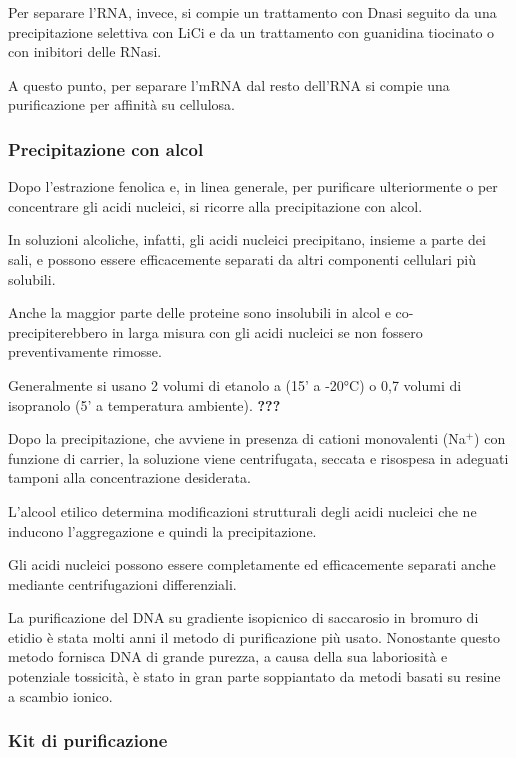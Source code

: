 \documentclass[]{article}
\begin{document}
Per separare l'RNA, invece, si compie un trattamento con Dnasi seguito
da una precipitazione selettiva con LiCi e da un trattamento con
guanidina tiocinato o con inibitori delle RNasi.

A questo punto, per separare l'mRNA dal resto dell'RNA si compie una
purificazione per affinità su cellulosa.

\subsubsection{Precipitazione con alcol}\label{precipitazione-con-alcol}

Dopo l'estrazione fenolica e, in linea generale, per purificare
ulteriormente o per concentrare gli acidi nucleici, si ricorre alla
precipitazione con alcol.

In soluzioni alcoliche, infatti, gli acidi nucleici precipitano, insieme
a parte dei sali, e possono essere efficacemente separati da altri
componenti cellulari più solubili.

Anche la maggior parte delle proteine sono insolubili in alcol e co-
precipiterebbero in larga misura con gli acidi nucleici se non fossero
preventivamente rimosse.

Generalmente si usano 2 volumi di etanolo a (15' a -20°C) o 0,7 volumi
di isopranolo (5' a temperatura ambiente). \textbf{???}

Dopo la precipitazione, che avviene in presenza di cationi monovalenti
(Na\(^+\)) con funzione di carrier, la soluzione viene centrifugata,
seccata e risospesa in adeguati tamponi alla concentrazione desiderata.

L'alcool etilico determina modificazioni strutturali degli acidi
nucleici che ne inducono l'aggregazione e quindi la precipitazione.

Gli acidi nucleici possono essere completamente ed efficacemente
separati anche mediante centrifugazioni differenziali.

La purificazione del DNA su gradiente isopicnico di saccarosio in
bromuro di etidio è stata molti anni il metodo di purificazione più
usato. Nonostante questo metodo fornisca DNA di grande purezza, a causa
della sua laboriosità e potenziale tossicità, è stato in gran parte
soppiantato da metodi basati su resine a scambio ionico.

\subsubsection{Kit di purificazione}\label{kit-di-purificazione}
\end{document}
